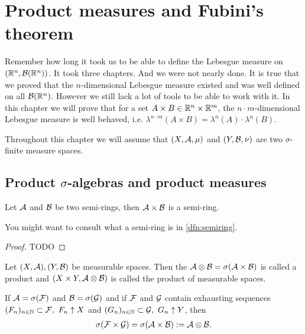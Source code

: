 

\chapter{Product measures and Fubini's theorem}

Remember how long it took us to be able to define the Lebesgue measure on $(\mathbb{R}^n, \mathcal{B}(\mathbb{R}^n))$. It took three chapters. And we were not nearly done. It is true that we proved that the $n$-dimensional Lebesgue measure existed and was well defined on all $\mathcal{B}(\mathbb{R}^n)$. However we still lack a lot of tools to be able to work with it. In this chapter we will prove that for a set $A \times B \in \mathbb{R}^n \times \mathbb{R}^m$, the $n\cdot m$-dimensional Lebesgue measure is well behaved, i.e. $\lambda^{n\cdot m}(A \times B) = \lambda^n(A) \cdot \lambda^n(B)$.

Throughout this chapter we will assume that $(X, \mathcal{A}, \mu)$ and $(Y, \mathcal{B}, \nu)$ are two $\sigma$-finite measure spaces.

\section{Product $\sigma$-algebras and product measures}

\begin{lem}
	Let $\mathcal{A}$ and $\mathcal{B}$ be two semi-rings, then $\mathcal{A} \times \mathcal{B}$ is a semi-ring.
\end{lem}

You might want to consult what a semi-ring is in \autoref{dfn:semiring}.

\begin{proof}
	TODO
\end{proof}

\begin{dfn}
	Let $(X, \mathcal{A}), (Y, \mathcal{B})$ be measurable spaces. Then the \siga $\mathcal{A} \otimes \mathcal{B} = \sigma(\mathcal{A} \times \mathcal{B})$ is called a product \siga and $(X \times Y, \mathcal{A} \otimes \mathcal{B})$ is called the product of measurable spaces.
\end{dfn}

\begin{lem}
	If $\mathcal{A} = \sigma(\mathcal{F})$ and $\mathcal{B} = \sigma(\mathcal{G})$ and if $\mathcal{F}$ and $\mathcal{G}$ contain exhausting sequences $(F_n)_{n\in\mathbb{N}} \subset \mathcal{F},\ F_n \uparrow X$ and $(G_n)_{n\in\N} \subset \calG,\ G_n \uparrow Y$, then
	\begin{align}
		\sigma(\mathcal{F} \times \mathcal{G}) = \sigma (\mathcal{A} \times \mathcal{B}) := \mathcal{A} \otimes \mathcal{B}.
	\end{align}
\end{lem}

